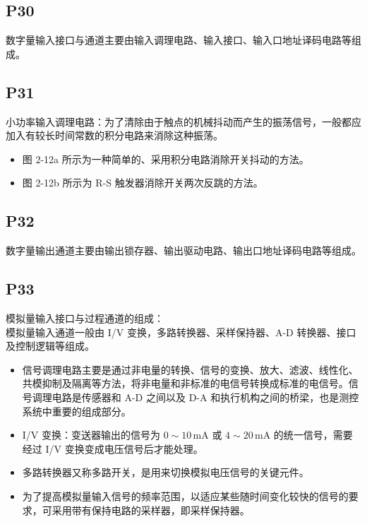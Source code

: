 \documentclass[zihao=-4
]{ctexart}%
\begin{document}
\hypertarget{header-n91}{%
\subsection{P30}\label{header-n91}}

数字量输入接口与通道主要由输入调理电路、输入接口、输入口地址译码电路等组成。

\hypertarget{header-n93}{%
\subsection{P31}\label{header-n93}}

小功率输入调理电路：为了清除由于触点的机械抖动而产生的振荡信号，一般都应加入有较长时间常数的积分电路来消除这种振荡。

\begin{itemize}
\item
  图 2-12a 所示为一种简单的、采用积分电路消除开关抖动的方法。
\item
  图 2-12b 所示为 R-S 触发器消除开关两次反跳的方法。
\end{itemize}

\hypertarget{header-n100}{%
\subsection{P32}\label{header-n100}}

数字量输出通道主要由输出锁存器、输出驱动电路、输出口地址译码电路等组成。

\hypertarget{header-n102}{%
\subsection{P33}\label{header-n102}}

模拟量输入接口与过程通道的组成：\\
模拟量输入通道一般由 I/V 变换，多路转换器、采样保持器、A-D
转换器、接口及控制逻辑等组成。

\begin{itemize}
\item
  信号调理电路主要是通过非电量的转换、信号的变换、放大、滤波、线性化、共模抑制及隔离等方法，将非电量和非标准的电信号转换成标准的电信号。信号调理电路是传感器和
  A-D 之间以及 D-A 和执行机构之间的桥梁，也是测控系统中重要的组成部分。
\item
  I/V 变换：变送器输出的信号为 \(0\sim10\,\mathrm{mA}\) 或
  \(4\sim20\,\mathrm{mA}\) 的统一信号，需要经过 I/V
  变换变成电压信号后才能处理。
\item
  多路转换器又称多路开关，是用来切换模拟电压信号的关键元件。
\item
  为了提高模拟量输入信号的频率范围，以适应某些随时间变化较快的信号的要求，可采用带有保持电路的采样器，即采样保持器。
\end{itemize}
\end{document}
